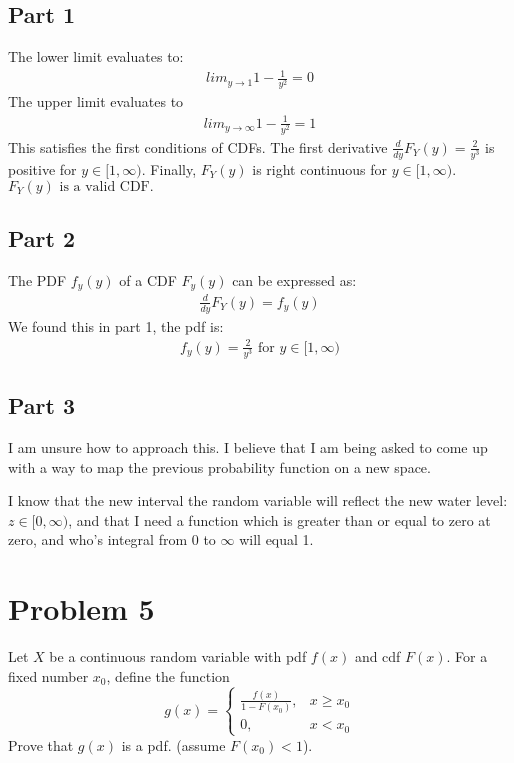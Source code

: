 \documentclass{article}
\begin{document}
\subsection*{Part 1}
The lower limit evaluates to:
\begin{align*}
lim_{y\rightarrow 1} 1 - \frac{1}{y^2} = 0
\end{align*}
The upper limit evaluates to
\begin{align*}
lim_{y\rightarrow \infty} 1 - \frac{1}{y^2} = 1
\end{align*}
This satisfies the first conditions of CDFs. The first derivative $\frac{d}{dy}F_Y(y) = \frac{2}{y^3}$ is positive for $y\in [1,\infty)$. Finally, $F_Y(y)$ is right continuous for $y\in [1,\infty)$. $\boxed{F_Y(y)\text{ is a valid CDF.}}$
\subsection*{Part 2}
The PDF $f_y(y)$ of a CDF $F_y(y)$ can be expressed as:
\begin{align*}
\frac{d}{dy}F_Y(y) = f_y(y)
\end{align*}
We found this in part 1, the pdf is:
\begin{align*}
f_y(y) = \frac{2}{y^3} \text{ for } y\in [1,\infty)
\end{align*}
\subsection*{Part 3}

I am unsure how to approach this. I believe that I am being asked to come up with a way to map the previous probability function on a new space.

I know that the new interval the random variable will reflect the new water level: $z \in [0,\infty)$, and that I need a function which is greater than or equal to zero at zero, and who's integral from 0 to $\infty$ will equal 1. 

\clearpage

\section*{Problem 5}
Let $X$ be a continuous random variable with pdf $f(x)$ and cdf $F(x)$. For a fixed number $x_0$, define the function
    \[
    g(x) = \begin{cases}\frac{f(x)}{1-F(x_0)} , & x \ge x_0 \\ 0 , & x < x_0 \end{cases} 
    \]
    Prove that $g(x)$ is a pdf. (assume $F(x_0) < 1$).
    
\end{document}
